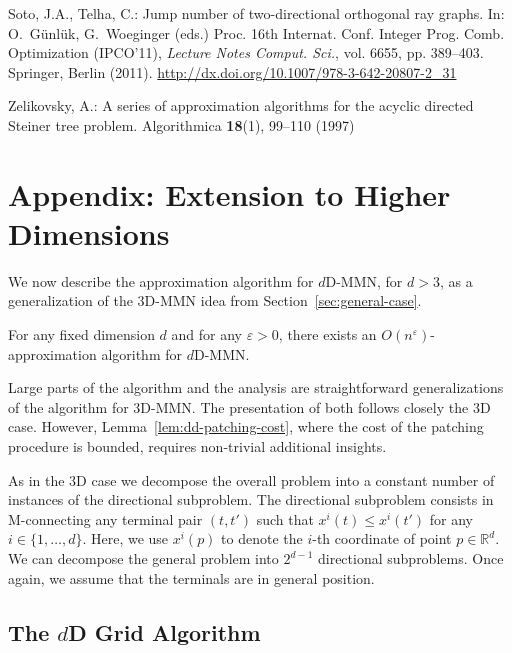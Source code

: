 \documentclass[11pt]{llncs}
\newcommand{\eps}{\ensuremath{\varepsilon}\xspace}
\begin{document}
\begin{thebibliography}{10}
Soto, J.A., Telha, C.: Jump number of two-directional orthogonal ray graphs.
\newblock In: O.~G{\"u}nl{\"u}k, G.~Woeginger (eds.) Proc. 16th Internat. Conf.
  Integer Prog. Comb. Optimization (IPCO'11), \emph{Lecture Notes Comput.
  Sci.}, vol. 6655, pp. 389--403. Springer, Berlin (2011).
\newblock \urlprefix\url{http://dx.doi.org/10.1007/978-3-642-20807-2_31}

Zelikovsky, A.: A series of approximation algorithms for the acyclic directed
  {Steiner} tree problem.
\newblock Algorithmica \textbf{18}(1), 99--110 (1997)

\end{thebibliography}
 
\clearpage

\appendix

\section*{\Large Appendix: Extension to Higher Dimensions} 
\label{sec:dd}

We now describe the approximation algorithm for $d$D-MMN,
for $d>3$, as a generalization of the 3D-MMN idea from 
Section~\ref{sec:general-case}. 

\begin{theorem}
  For any fixed dimension $d$ and for any $\eps>0$, there
  exists an $O(n^\eps)$-approximation algorithm for $d$D-MMN.
\end{theorem}

Large parts of the algorithm and the analysis are 
straightforward generalizations of the algorithm for 3D-MMN.  The
presentation of both follows closely the 3D case. However,
Lemma~\ref{lem:dd-patching-cost}, where the cost of the 
patching procedure is bounded, requires non-trivial additional insights.

As in the 3D case we decompose the overall problem into a constant
number of instances of the directional subproblem.  The directional
subproblem consists in M-connecting any terminal pair $(t,t')$ such
that $x^i(t)\leq x^i(t')$ for any $i\in\{1,\dots,d\}$.  Here, we use
$x^i(p)$ to denote the $i$-th coordinate of point $p\in\mathbb{R}^d$.
We can decompose the general problem into $2^{d-1}$ directional
subproblems. Once again, we assume that the terminals are in general position.

\subsection*{The $d$D Grid Algorithm} 
\end{document}
